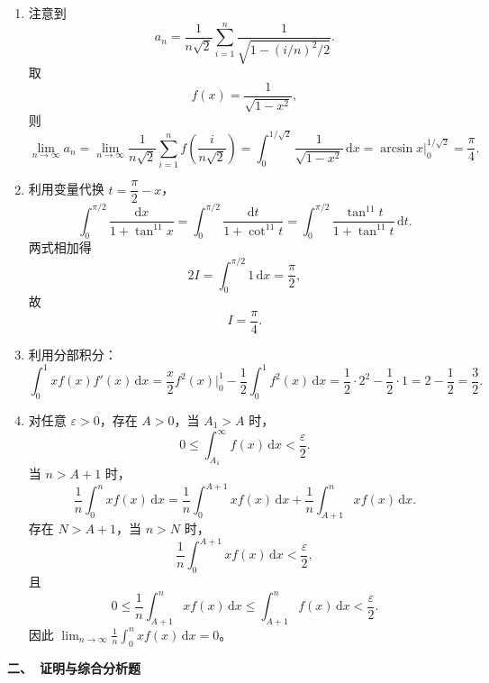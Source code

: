 \begin{enumerate}
    \item 注意到
    \[
    a_n = \frac{1}{n\sqrt{2}} \sum_{i=1}^n \frac{1}{\sqrt{1 - (i/n)^2/2}}.
    \]
    取
    \[
    f(x) = \frac{1}{\sqrt{1 - x^2}},
    \]
    则
    \[
    \lim_{n\to\infty} a_n
    = \lim_{n\to\infty} \frac{1}{n\sqrt{2}} \sum_{i=1}^n f\!\left(\frac{i}{n\sqrt{2}}\right)
    = \int_0^{1/\sqrt{2}} \frac{1}{\sqrt{1 - x^2}}\,\mathrm{d}x
    = \arcsin x \Big|_0^{1/\sqrt{2}}
    = \frac{\pi}{4}.
    \]

    \item 利用变量代换 $t = \dfrac{\pi}{2} - x$，
    \[
    \int_0^{\pi/2} \frac{\mathrm{d}x}{1 + \tan^{11}x}
    = \int_0^{\pi/2} \frac{\mathrm{d}t}{1 + \cot^{11}t}
    = \int_0^{\pi/2} \frac{\tan^{11}t}{1 + \tan^{11}t}\,\mathrm{d}t.
    \]
    两式相加得
    \[
    2I = \int_0^{\pi/2} 1\,\mathrm{d}x = \frac{\pi}{2},
    \]
    故
    \[
    I = \frac{\pi}{4}.
    \]

    \item 利用分部积分：
    \[
    \int_0^1 x f(x) f'(x)\,\mathrm{d}x
    = \frac{x}{2} f^2(x) \Big|_0^1 - \frac{1}{2} \int_0^1 f^2(x)\,\mathrm{d}x
    = \frac{1}{2} \cdot 2^2 - \frac{1}{2} \cdot 1
    = 2 - \frac{1}{2}
    = \frac{3}{2}.
    \]

    \item 对任意 $\varepsilon > 0$，存在 $A > 0$，当 $A_1 > A$ 时，
    \[
    0 \leq \int_{A_1}^\infty f(x)\,\mathrm{d}x < \frac{\varepsilon}{2}.
    \]
    当 $n > A + 1$ 时，
    \[
    \frac{1}{n} \int_0^n x f(x)\,\mathrm{d}x
    = \frac{1}{n} \int_0^{A+1} x f(x)\,\mathrm{d}x
    + \frac{1}{n} \int_{A+1}^n x f(x)\,\mathrm{d}x.
    \]
    存在 $N > A + 1$，当 $n > N$ 时，
    \[
    \frac{1}{n} \int_0^{A+1} x f(x)\,\mathrm{d}x < \frac{\varepsilon}{2},
    \]
    且
    \[
    0 \leq \frac{1}{n} \int_{A+1}^n x f(x)\,\mathrm{d}x
    \leq \int_{A+1}^n f(x)\,\mathrm{d}x < \frac{\varepsilon}{2}.
    \]
    因此 $\displaystyle \lim_{n\to\infty} \frac{1}{n} \int_0^n x f(x)\,\mathrm{d}x = 0$。
\end{enumerate}

\bigskip

\textbf{二、\ 证明与综合分析题}

